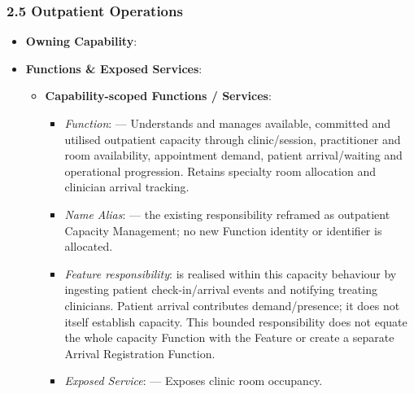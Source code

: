 \par\smallskip
{}\label{rad:hso:133}
\subsubsection*{2.5 Outpatient Operations}
\label{rad:hso:134}

\begin{itemize}

\item 
\textbf{Owning Capability}: \texttt{}



\item 
\textbf{Functions \& Exposed Services}:


\begin{itemize}

\item 
\textbf{Capability-scoped Functions /\allowbreak{} Services}:


\begin{itemize}

\item 
\emph{Function}: \texttt{} — Understands and manages available, committed and utilised outpatient capacity through clinic/\allowbreak{}session, practitioner and room availability, appointment demand, patient arrival/\allowbreak{}waiting and operational progression. Retains specialty room allocation and clinician arrival tracking.



\item 
\emph{Name Alias}: \texttt{} — the existing responsibility reframed as outpatient Capacity Management; no new Function identity or identifier is allocated.



\item 
\emph{Feature responsibility}: \texttt{} is realised within this capacity behaviour by ingesting patient check-in/\allowbreak{}arrival events and notifying treating clinicians. Patient arrival contributes demand/\allowbreak{}presence; it does not itself establish capacity. This bounded responsibility does not equate the whole capacity Function with the Feature or create a separate Arrival Registration Function.



\item 
\emph{Exposed Service}: \texttt{} — Exposes clinic room occupancy.




\end{itemize}
\end{itemize}
\end{itemize}
